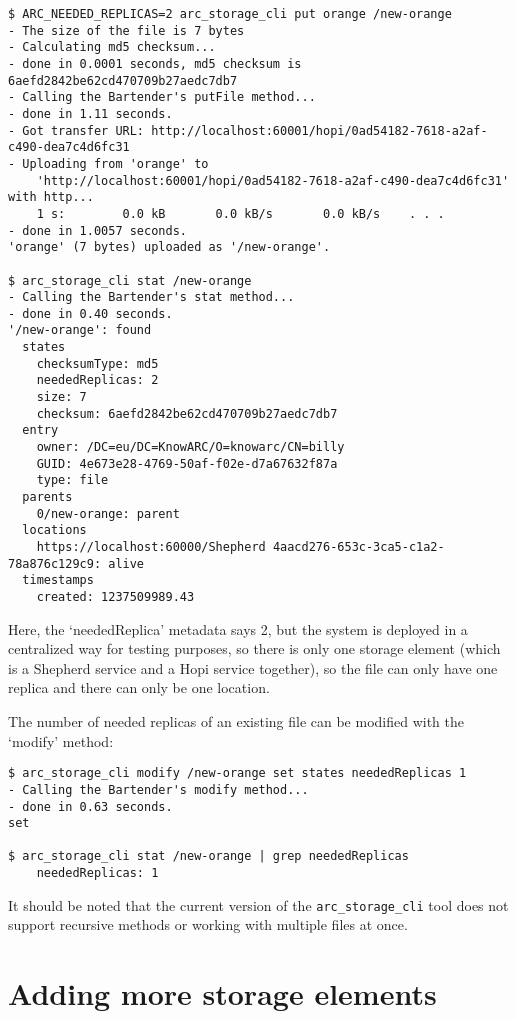 \documentclass{article}
\begin{document}
\begin{verbatim}
$ ARC_NEEDED_REPLICAS=2 arc_storage_cli put orange /new-orange
- The size of the file is 7 bytes
- Calculating md5 checksum...
- done in 0.0001 seconds, md5 checksum is 6aefd2842be62cd470709b27aedc7db7
- Calling the Bartender's putFile method...
- done in 1.11 seconds.
- Got transfer URL: http://localhost:60001/hopi/0ad54182-7618-a2af-c490-dea7c4d6fc31
- Uploading from 'orange' to
    'http://localhost:60001/hopi/0ad54182-7618-a2af-c490-dea7c4d6fc31' with http...
    1 s:        0.0 kB       0.0 kB/s       0.0 kB/s    . . .       
- done in 1.0057 seconds.
'orange' (7 bytes) uploaded as '/new-orange'.

$ arc_storage_cli stat /new-orange
- Calling the Bartender's stat method...
- done in 0.40 seconds.
'/new-orange': found
  states
    checksumType: md5
    neededReplicas: 2
    size: 7
    checksum: 6aefd2842be62cd470709b27aedc7db7
  entry
    owner: /DC=eu/DC=KnowARC/O=knowarc/CN=billy
    GUID: 4e673e28-4769-50af-f02e-d7a67632f87a
    type: file
  parents
    0/new-orange: parent
  locations
    https://localhost:60000/Shepherd 4aacd276-653c-3ca5-c1a2-78a876c129c9: alive
  timestamps
    created: 1237509989.43

\end{verbatim}

Here, the `neededReplica' metadata says 2, but the system is deployed in a centralized way for testing purposes, so there is only one storage element (which is a Shepherd service and a Hopi service together), so the file can only have one replica and there can only be one location.

The number of needed replicas of an existing file can be modified with the `modify' method:

\begin{verbatim}
$ arc_storage_cli modify /new-orange set states neededReplicas 1
- Calling the Bartender's modify method...
- done in 0.63 seconds.
set

$ arc_storage_cli stat /new-orange | grep neededReplicas
    neededReplicas: 1
\end{verbatim}

It should be noted that the current version of the \verb!arc_storage_cli! tool does not support recursive methods or working with multiple files at once.


\section{Adding more storage elements}
\end{document}
